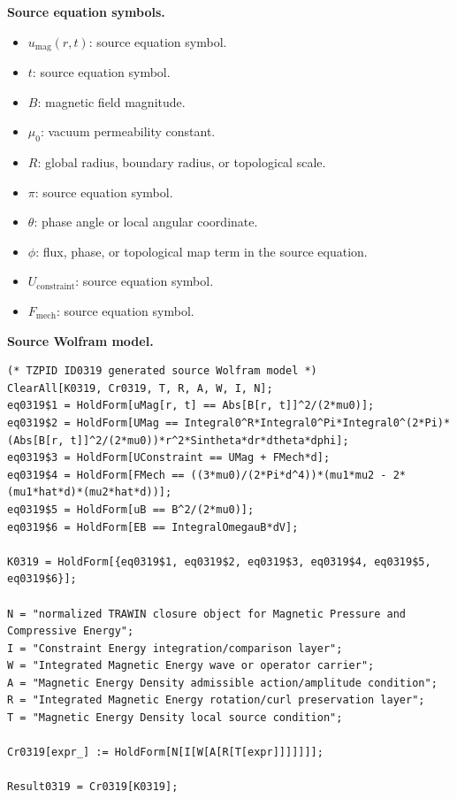 \begin{minipage}[t]{0.49\linewidth}
\begingroup
\small
\raggedright
\textbf{Source equation symbols.}\par
\begin{itemize}[leftmargin=1.35em,itemsep=1pt,topsep=1pt,parsep=0pt]
    \item $u_{\mathrm{mag}}(r,t)$: source equation symbol.
    \item $t$: source equation symbol.
    \item $B$: magnetic field magnitude.
    \item $\mu_{0}$: vacuum permeability constant.
    \item $R$: global radius, boundary radius, or topological scale.
    \item $\pi$: source equation symbol.
    \item $\theta$: phase angle or local angular coordinate.
    \item $\phi$: flux, phase, or topological map term in the source equation.
    \item $U_{\mathrm{constraint}}$: source equation symbol.
    \item $F_{\mathrm{mech}}$: source equation symbol.
\end{itemize}
\endgroup
\end{minipage}\hfill
\begin{minipage}[t]{0.47\linewidth}
\begingroup
\scriptsize
\raggedright
\textbf{Source Wolfram model.}\par
\begin{Verbatim}[fontsize=\tiny,breaklines=true,breakanywhere=true]
(* TZPID ID0319 generated source Wolfram model *)
ClearAll[K0319, Cr0319, T, R, A, W, I, N];
eq0319$1 = HoldForm[uMag[r, t] == Abs[B[r, t]]^2/(2*mu0)];
eq0319$2 = HoldForm[UMag == Integral0^R*Integral0^Pi*Integral0^(2*Pi)*(Abs[B[r, t]]^2/(2*mu0))*r^2*Sintheta*dr*dtheta*dphi];
eq0319$3 = HoldForm[UConstraint == UMag + FMech*d];
eq0319$4 = HoldForm[FMech == ((3*mu0)/(2*Pi*d^4))*(mu1*mu2 - 2*(mu1*hat*d)*(mu2*hat*d))];
eq0319$5 = HoldForm[uB == B^2/(2*mu0)];
eq0319$6 = HoldForm[EB == IntegralOmegauB*dV];

K0319 = HoldForm[{eq0319$1, eq0319$2, eq0319$3, eq0319$4, eq0319$5, eq0319$6}];

N = "normalized TRAWIN closure object for Magnetic Pressure and Compressive Energy";
I = "Constraint Energy integration/comparison layer";
W = "Integrated Magnetic Energy wave or operator carrier";
A = "Magnetic Energy Density admissible action/amplitude condition";
R = "Integrated Magnetic Energy rotation/curl preservation layer";
T = "Magnetic Energy Density local source condition";

Cr0319[expr_] := HoldForm[N[I[W[A[R[T[expr]]]]]]];

Result0319 = Cr0319[K0319];
\end{Verbatim}
\endgroup
\end{minipage}

